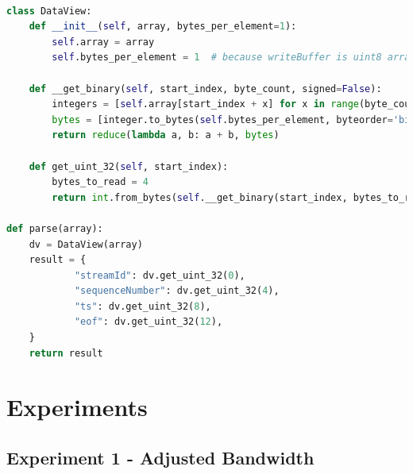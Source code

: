 \documentclass{l4proj}
\begin{document}
\begin{appendices}
\begin{lstlisting}[language=python, caption={Added server functionality that allowed the server to decode packet headers.}, label=lst:server-decode-headers]
    
class DataView:
    def __init__(self, array, bytes_per_element=1):
        self.array = array
        self.bytes_per_element = 1  # because writeBuffer is uint8 array

    def __get_binary(self, start_index, byte_count, signed=False):
        integers = [self.array[start_index + x] for x in range(byte_count)]
        bytes = [integer.to_bytes(self.bytes_per_element, byteorder='big', signed=False) for integer in integers]  
        return reduce(lambda a, b: a + b, bytes)

    def get_uint_32(self, start_index):
        bytes_to_read = 4
        return int.from_bytes(self.__get_binary(start_index, bytes_to_read), byteorder='big') 

def parse(array):
    dv = DataView(array)
    result = {
            "streamId": dv.get_uint_32(0),
            "sequenceNumber": dv.get_uint_32(4),
            "ts": dv.get_uint_32(8),
            "eof": dv.get_uint_32(12),
    }
    return result

\end{lstlisting}


\section{Experiments}
\subsection{Experiment 1 - Adjusted Bandwidth}



\end{appendices}
\end{document}
